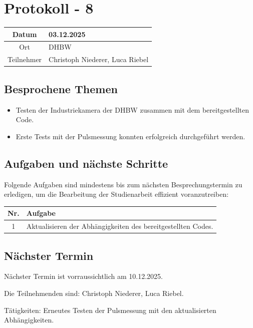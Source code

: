 \chapter{Protokoll - 8}

\begin{table}[H]
    \centering
    \begin{tabular}{|c|l|}
        \hline
        Datum& 03.12.2025 \\
        \hline
        Ort& DHBW\\
        \hline
        Teilnehmer& Christoph Niederer, Luca Riebel\\
        \hline
    \end{tabular}
\end{table}

\section{Besprochene Themen}
\begin{itemize}
    \item Testen der Industriekamera der DHBW zusammen mit dem bereitgestellten Code.
    \item Erste Tests mit der Pulsmessung konnten erfolgreich durchgeführt werden.
\end{itemize}

\section{Aufgaben und nächste Schritte}
Folgende Aufgaben sind mindestens bis zum nächsten Besprechungstermin zu erledigen, um die Bearbeitung der Studienarbeit effizient voranzutreiben:

\begin{table}[H]
    \centering
    \begin{tabular}{|c|p{12cm}|}
        \hline
        \textbf{Nr.} & \textbf{Aufgabe}\\
        \hline
        1 & Aktualisieren der Abhängigkeiten des bereitgestellten Codes. \\
        \hline
    \end{tabular}
\end{table}

\section{Nächster Termin}
Nächster Termin ist vorraussichtlich am 10.12.2025.

Die Teilnehmenden sind: Christoph Niederer, Luca Riebel.

Tätigkeiten: Erneutes Testen der Pulsmessung mit den aktualisierten Abhängigkeiten.
